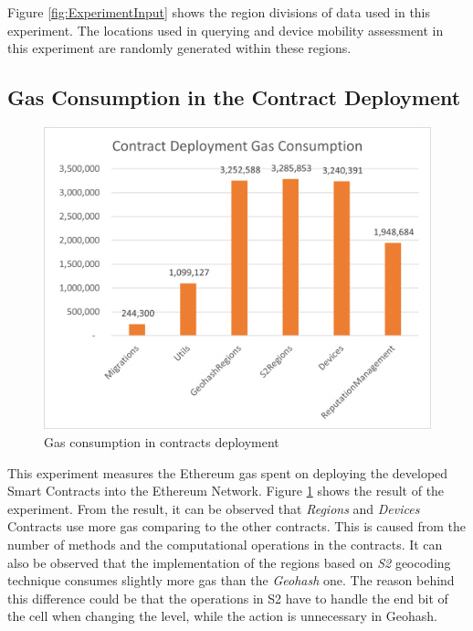\npara Figure \ref{fig:ExperimentInput} shows the region divisions of data used in this experiment.
The locations used in querying and device mobility assessment in this experiment are randomly generated within these regions.

\subsection*{Gas Consumption in the Contract Deployment}

\begin{figure}[htb!]
  \centering
  \includegraphics[width=\textwidth]{images/ExperimentDeploy.png}
  \caption{Gas consumption in contracts deployment}
  \label{fig:ExperimentDeploy}
\end{figure}

\npara This experiment measures the Ethereum gas spent on deploying the developed Smart Contracts into the Ethereum Network.
Figure \ref{fig:ExperimentDeploy} shows the result of the experiment.
From the result, it can be observed that \textit{Regions} and \textit{Devices} Contracts use more gas comparing to the other contracts.
This is caused from the number of methods and the computational operations in the contracts.
It can also be observed that the implementation of the regions based on \textit{S2} geocoding technique consumes slightly more gas than the \textit{Geohash} one.
The reason behind this difference could be that the operations in S2 have to handle the end bit of the cell when changing the level, while the action is unnecessary in Geohash.


